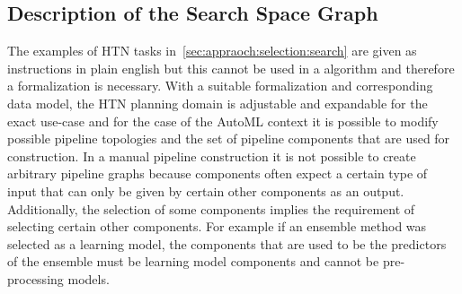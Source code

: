 \subsection{Description of the Search Space Graph}
\label{sec:appraoch:selection:graph}
The examples of HTN tasks in~\ref{sec:appraoch:selection:search} are given as instructions in plain english but this cannot be used in a algorithm and therefore a formalization is necessary.
With a suitable formalization and corresponding data model, the HTN planning domain is adjustable and expandable for the exact use-case and for the case of the AutoML context it is possible to modify possible pipeline topologies and the set of pipeline components that are used for construction.\newline
In a manual pipeline construction it is not possible to create arbitrary pipeline graphs because components often expect a certain type of input that can only be given by certain other components as an output.
Additionally, the selection of some components implies the requirement of selecting certain other components.
For example if an ensemble method was selected as a learning model, the components that are used to be the predictors of the ensemble must be learning model components and cannot be pre-processing models.

